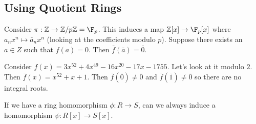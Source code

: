 \begin{example}
\end{example}

\subsection{Using Quotient Rings}

Consider $\pi : \mathbb{Z} \to \mathbb{Z}/p\mathbb{Z} = \F_p$. This induces a map $\mathbb{Z}[x] \to \F_p[x]$ where $a_nx^n \mapsto \bar{a}_nx^n$ (looking at the coefficients modulo $p$). Suppose there exists an $a \in Z$ such that $f(a) = 0$. Then $\bar{f}(\bar{a}) = \bar{0}$.

\begin{example}
Consider $f(x) = 3x^{52} + 4x^{49} - 16x^{20} - 17x - 1755$. Let's look at it modulo $2$. Then $\bar{f}(x) = x^{52} + x + 1$. Then $\bar{f}(\bar{0}) \not= \bar{0}$ and $\bar{f}(\bar{1}) \not= \bar{0}$ so there are no integral roots.
\end{example}

\begin{problem}
If we have a ring homomorphism $\phi : R \to S$, can we always induce a homomorphism $\psi : R[x] \to S[x]$.
\end{problem}